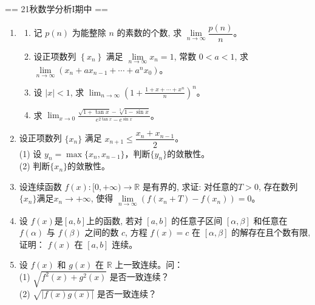 == 21秋数学分析I期中 ==
\begin{enumerate}
\item[一] 
\begin{enumerate}[label=(\arabic*)]
    \item 记 $p(n)$ 为能整除 $n$ 的素数的个数, 求 $\lim\limits_{n \to \infty} \dfrac{p(n)}{n}$。
    \item 设正项数列 $\left\{x_{n}\right\}$ 满足 $\lim\limits_{n \to \infty} x_{n}=1$, 常数 $0<a<1$, 
    求 $\lim\limits_{n \to \infty}(x_{n}+a x_{n-1}+\cdots+a^{n} x_{0})$。
    \item 设 $|x|<1$, 求 $\displaystyle\lim_{n \to \infty}\left(1+\frac{1+x+\cdots+x^{n}}{n}\right)^{n}$。
    \item 求 $\displaystyle\lim_{x \to 0} \frac{\sqrt{1+\tan x}-\sqrt[3]{1-\sin x}}{e^{2 \tan x}-e^{\sin x}}$。
\end{enumerate}

\item[二] 设正项数列 $\{x_{n}\}$ 满足 $x_{n+1} \le \dfrac{x_{n}+x_{n-1}}{2}$。\\
(1) 设 $y_{n}=\max\{x_{n}, x_{n-1}\}$，判断$\{y_{n}\}$的敛散性。\\
(2) 判断$\{x_{n}\}$的敛散性。

\item[三] 设连续函数 $f(x):[0,+\infty) \to \mathbb{R}$ 是有界的, 求证:
对任意的$T>0$, 存在数列 $\{x_{n}\}$满足$x_{n} \to +\infty$, 
使得 $\lim\limits_{n \to \infty}(f(x_{n}+T)-f(x_{n}))=0$。

\item[四] 设 $f(x)$是$[a, b]$上的函数, 
若对 $[a, b]$ 的任意子区间 $[\alpha, \beta]$ 和任意在 $f(\alpha)$ 与 $f(\beta)$ 之间的数 $c$,
方程 $f(x)=c$ 在 $[\alpha, \beta]$ 的解存在且个数有限, 证明： $f(x)$ 在 $[a, b]$ 连续。

\item[五] 设 $f(x)$ 和 $g(x)$ 在 $\mathbb{R}$ 上一致连续。问：\\
(1) $\sqrt{f^{2}(x)+g^{2}(x)}$ 是否一致连续？\\
(2) $\sqrt{|f(x) g(x)|}$ 是否一致连续？
\end{enumerate}

